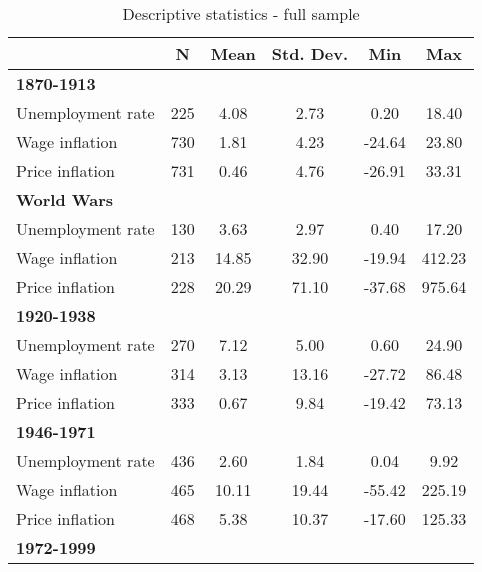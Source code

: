 \begin{table}[!h]
\caption{Descriptive statistics - full sample}
\label{T_Descriptives_Full}
\centering
\def\sym#1{\ifmmode^{#1}\else\(^{#1}\)\fi}
\begin{tabular}{l*{1}{ccccc}}
\hline\hline
                    &       \textbf{N}    &        \textbf{Mean}&   \textbf{Std. Dev.}&         \textbf{Min}&         \textbf{Max}\\
\hline
\textbf{1870-1913}           &            &            &            &            &            \\
Unemployment rate   &         225&        4.08&        2.73&        0.20&       18.40\\
Wage inflation      &         730&        1.81&        4.23&      -24.64&       23.80\\
Price inflation     &         731&        0.46&        4.76&      -26.91&       33.31\\
\hline
\textbf{World Wars}          &            &            &            &            &            \\
Unemployment rate   &         130&        3.63&        2.97&        0.40&       17.20\\
Wage inflation      &         213&       14.85&       32.90&      -19.94&      412.23\\
Price inflation     &         228&       20.29&       71.10&      -37.68&      975.64\\
\hline
\textbf{1920-1938 }          &            &            &            &            &            \\
Unemployment rate   &         270&        7.12&        5.00&        0.60&       24.90\\
Wage inflation      &         314&        3.13&       13.16&      -27.72&       86.48\\
Price inflation     &         333&        0.67&        9.84&      -19.42&       73.13\\
\hline
\textbf{1946-1971 }          &            &            &            &            &            \\
Unemployment rate   &         436&        2.60&        1.84&        0.04&        9.92\\
Wage inflation      &         465&       10.11&       19.44&      -55.42&      225.19\\
Price inflation     &         468&        5.38&       10.37&      -17.60&      125.33\\
\hline
\textbf{1972-1999}           &            &            &            &            &            \\

\end{tabular}
\end{table}
